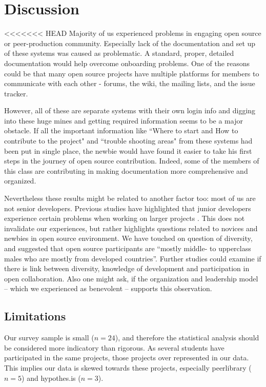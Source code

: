 \section{Discussion}

<<<<<<< HEAD
Majority of us experienced problems in engaging open source or peer-production community. Especially lack of the documentation and set up of these systems was caused as problematic. A standard, proper, detailed documentation  would help overcome onboarding problems. One of the reasons could be  that many open source projects have multiple platforms for members to communicate with each other - forums, the wiki, the mailing lists, and the issue tracker.

However, all of these are separate systems with their own login info and digging into these huge mines and getting required information seems to be a major obstacle. If all the important information like ``Where to start and How to contribute to the project" and ``trouble shooting areas" from these systems had been put in single place, the newbie would have found it easier to take his first steps in the journey of open source contribution. Indeed, some of the members of this class are contributing in making documentation more comprehensive and organized.

Nevertheless these results might be related to another factor too: most of us are not senior developers. Previous studies have highlighted that junior developers experience certain problems when working on larger projects \cite{Begel2008}. This does not invalidate our experiences, but rather highlights questions related to novices and newbies in open source environment. We have touched on question of diversity, and suggested that open source participants are ``mostly middle- to upperclass males who are mostly from developed countries''. Further studies could examine if there is link between diversity, knowledge of development and participation in open collaboration. Also one might ask, if the organization and leadership model -- which we experienced as benevolent -- supports this observation.


\subsection{Limitations}
\label{sec:limitations}
Our survey sample is small ($n=24$), and therefore the statistical analysis should be considered more indicatory than rigorous. As several students have participated in the same projects, those projects over represented in our data. This implies our data is skewed towards these projects, especially peerlibrary ($n=5$) and hypothes.is ($n=3$).

